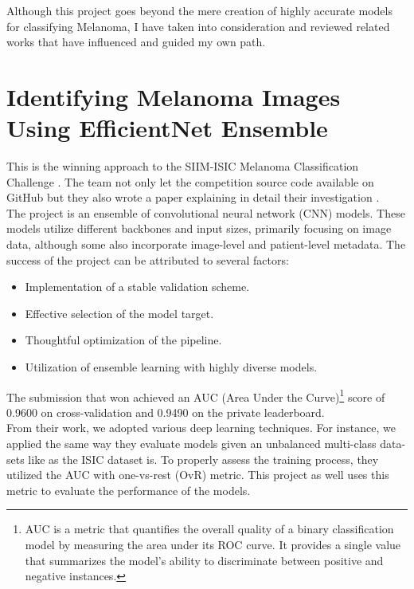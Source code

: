 Although this project goes beyond the mere creation of highly accurate models for classifying Melanoma, I have taken into consideration and reviewed related works that have influenced and guided my own path.

\section{Identifying Melanoma Images Using EfficientNet Ensemble}

This is the winning approach to the SIIM-ISIC Melanoma Classification Challenge \cite{ISICKaggle}. The team not only let the competition source code available on GitHub \cite{WinningISICGithub} but they also wrote a paper explaining in detail their investigation \cite{WinningISIC}. \\

The project is an ensemble of convolutional neural network (CNN) models. These models utilize different backbones and input sizes, primarily focusing on image data, although some also incorporate image-level and patient-level metadata. The success of the project can be attributed to several factors:

\begin{itemize}
    \item Implementation of a stable validation scheme.
    \item Effective selection of the model target.
    \item Thoughtful optimization of the pipeline.
    \item Utilization of ensemble learning with highly diverse models.
\end{itemize}

The submission that won achieved an AUC (Area Under the Curve)\footnote{AUC is a metric that quantifies the overall quality of a binary classification model by measuring the area under its ROC curve. It provides a single value that summarizes the model's ability to discriminate between positive and negative instances.} score of 0.9600 on cross-validation and 0.9490 on the private leaderboard. \\

From their work, we adopted various deep learning techniques. For instance, we applied the same way they evaluate models given
an unbalanced multi-class data-sets like as the ISIC dataset is.
To properly assess the training process, they utilized the AUC with one-vs-rest (OvR) metric. This project as well uses this metric to evaluate the performance of the models. \\

